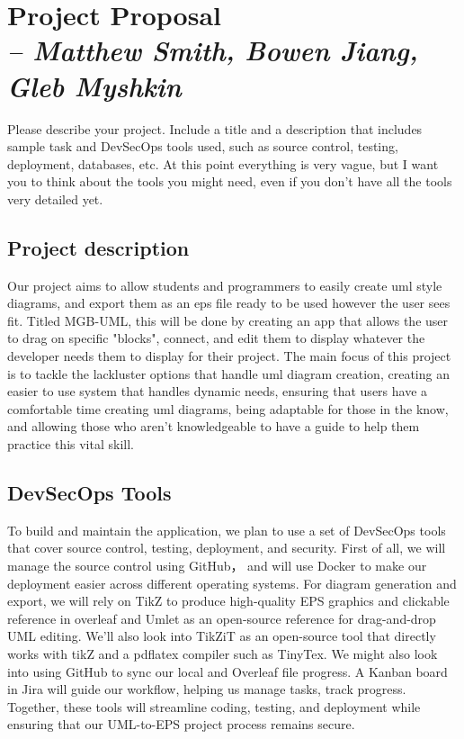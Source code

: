 \chapter{Project Proposal\\ 
\small{\textit{-- Matthew Smith, Bowen Jiang, Gleb Myshkin}}}
\label{Chapter!Project Proposal}


    Please describe your project.
    Include a title and a description that includes sample task and DevSecOps tools used, such as source control, testing, deployment, databases, etc.  At this point everything is very vague, but I want you to think about the tools you might need, even if you don't have all the tools very detailed yet.

\section{Project description}

\hspace {2.5em} Our project aims to allow students and programmers to easily create uml style diagrams, and export them as an eps file ready to be used however the user sees fit. Titled MGB-UML, this will be done by creating an app that allows the user to drag on specific "blocks", connect, and edit them to display whatever the developer needs them to display for their project. The main focus of this project is to tackle the lackluster options that handle uml diagram creation,  creating an easier to use system that handles dynamic needs, ensuring that users have a comfortable time creating uml diagrams, being adaptable for those in the know, and allowing those who aren't knowledgeable to have a guide to help them practice this vital skill.

\section{DevSecOps Tools}
\hspace {2.5em} To build and maintain the application, we plan to use a set of DevSecOps tools that cover source control, testing, deployment, and security. First of all, we will manage the source control using GitHub， and will use Docker to make our deployment easier across different operating systems. For diagram generation and export, we will rely on TikZ to produce high-quality EPS graphics and clickable reference in overleaf and Umlet as an open-source reference for drag-and-drop UML editing. We'll also look into TikZiT as an open-source tool that directly works with tikZ and a pdflatex compiler such as TinyTex. We might also look into using GitHub to sync our local and Overleaf file progress. A Kanban board in Jira will guide our workflow, helping us manage tasks, track progress. Together, these tools will streamline coding, testing, and deployment while ensuring that our UML-to-EPS project process remains secure.

